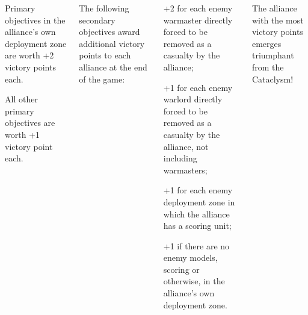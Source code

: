 \documentclass{40k}
\begin{document}
\begin{columns}
\begin{squishitemize}
  \item Primary objectives in the alliance's own deployment zone are
    worth +2 victory points each.

  \item All other primary objectives are worth +1 victory point each.
  \end{squishitemize}

    The following secondary
  objectives award additional victory points to each alliance at the
  end of the game:
  \begin{squishitemize}
  \item +2 for each enemy warmaster directly forced to be removed as a
    casualty by the alliance;

  \item +1 for each enemy warlord directly forced to be removed as a
    casualty by the alliance, not including warmasters;

  \item +1 for each enemy deployment zone in which the alliance has a
    scoring unit;

  \item +1 if there are no enemy models, scoring or otherwise, in the
    alliance's own deployment zone.
  \end{squishitemize}

  \bigskip%
  The alliance with the most victory points emerges triumphant from
  the Cataclysm!

\end{columns}

\divider
\end{document}
